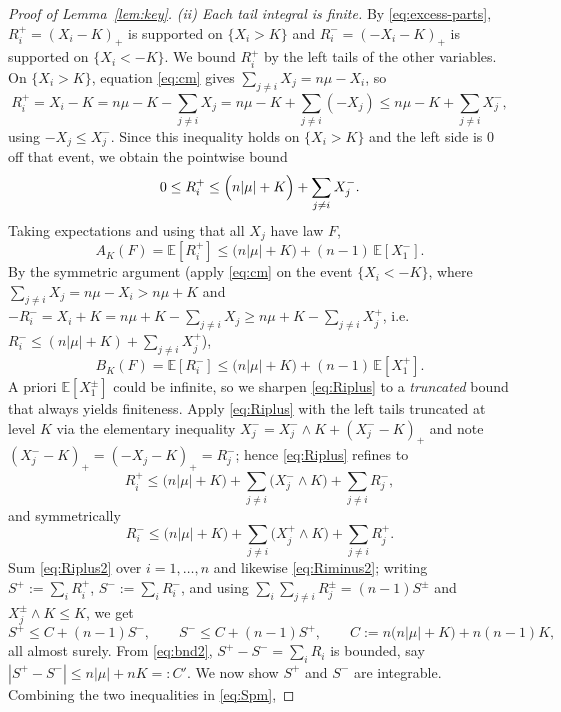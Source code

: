 \documentclass{amsart}
\theoremstyle{definition}
\theoremstyle{remark}
\begin{document}
\begin{proof}[Proof of Lemma~\ref{lem:key}]
\emph{(ii) Each tail integral is finite.}
By \eqref{eq:excess-parts}, $R_i^+=(X_i-K)_+$ is supported on $\{X_i>K\}$ and
$R_i^-=(-X_i-K)_+$ is supported on $\{X_i<-K\}$. We bound $R_i^+$ by the left tails of the
other variables. On $\{X_i>K\}$, equation \eqref{eq:cm} gives
$\sum_{j\ne i}X_j=n\mu-X_i$, so
\[
R_i^+=X_i-K=n\mu-K-\sum_{j\ne i}X_j
=n\mu-K+\sum_{j\ne i}(-X_j)\le n\mu-K+\sum_{j\ne i}X_j^- ,
\]
using $-X_j\le X_j^-$. Since this inequality holds on $\{X_i>K\}$ and the left side is $0$
off that event, we obtain the pointwise bound
\begin{equation}\label{eq:Riplus}
0\le R_i^+\le \Bigl(n|\mu|+K\Bigr)+\sum_{j\ne i}X_j^- .
\end{equation}
Taking expectations and using that all $X_j$ have law $F$,
\[
A_K(F)=\mathbb{E}[R_i^+]\le \bigl(n|\mu|+K\bigr)+(n-1)\,\mathbb{E}[X_1^-].
\]
By the symmetric argument (apply \eqref{eq:cm} on the event $\{X_i<-K\}$, where
$\sum_{j\ne i}X_j=n\mu-X_i>n\mu+K$ and $-R_i^-=X_i+K=n\mu+K-\sum_{j\ne i}X_j\ge
n\mu+K-\sum_{j\ne i}X_j^+$, i.e. $R_i^-\le (n|\mu|+K)+\sum_{j\ne i}X_j^+$),
\[
B_K(F)=\mathbb{E}[R_i^-]\le \bigl(n|\mu|+K\bigr)+(n-1)\,\mathbb{E}[X_1^+].
\]
A priori $\mathbb{E}[X_1^\pm]$ could be infinite, so we sharpen \eqref{eq:Riplus} to a
\emph{truncated} bound that always yields finiteness. Apply \eqref{eq:Riplus} with the
left tails truncated at level $K$ via the elementary inequality $X_j^-=X_j^-\wedge K+(X_j^--K)_+$
and note $(X_j^--K)_+=(-X_j-K)_+=R_j^-$; hence \eqref{eq:Riplus} refines to
\begin{equation}\label{eq:Riplus2}
R_i^+\le \bigl(n|\mu|+K\bigr)+\sum_{j\ne i}\bigl(X_j^-\wedge K\bigr)+\sum_{j\ne i}R_j^- ,
\end{equation}
and symmetrically
\begin{equation}\label{eq:Riminus2}
R_i^-\le \bigl(n|\mu|+K\bigr)+\sum_{j\ne i}\bigl(X_j^+\wedge K\bigr)+\sum_{j\ne i}R_j^+ .
\end{equation}
Sum \eqref{eq:Riplus2} over $i=1,\dots,n$ and likewise \eqref{eq:Riminus2}; writing
$S^+:=\sum_i R_i^+$, $S^-:=\sum_i R_i^-$, and using
$\sum_i\sum_{j\ne i}R_j^\pm=(n-1)S^\pm$ and $X_j^\pm\wedge K\le K$, we get
\begin{equation}\label{eq:Spm}
S^+\le C+(n-1)S^- ,\qquad S^-\le C+(n-1)S^+ ,\qquad C:=n\bigl(n|\mu|+K\bigr)+n(n-1)K ,
\end{equation}
all almost surely. From \eqref{eq:bnd2}, $S^+-S^-=\sum_i R_i$ is bounded, say
$|S^+-S^-|\le n|\mu|+nK=:C'$. We now show $S^+$ and $S^-$ are integrable. Combining the two
inequalities in \eqref{eq:Spm},

\end{proof}
\end{document}

